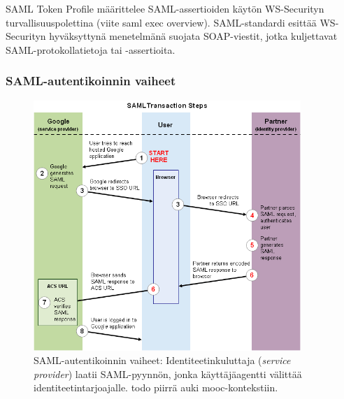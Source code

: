 \documentclass[finnish,gradu]{tktltiki}
\begin{document}
  SAML Token Profile määrittelee SAML-assertioiden käytön WS-Securityn turvallisuuspolettina (viite saml exec overview).
  SAML-standardi esittää WS-Securityn hyväksyttynä menetelmänä suojata SOAP-viestit, jotka kuljettavat SAML-protokollatietoja tai -assertioita.



  \subsubsection{SAML-autentikoinnin vaiheet} %
  \label{ssub:saml_autentikoinnin_vaiheet}

    \begin{figure}
      \centering
      \includegraphics[width=0.9\textwidth]{images/google_saml_workflow_vertical.png}
      \caption{SAML-autentikoinnin vaiheet: Identiteetinkuluttaja (\emph{service provider}) laatii SAML-pyynnön, jonka käyttäjäagentti välittää identiteetintarjoajalle. todo piirrä auki mooc-kontekstiin.}
      \label{fig:saml_auth_vaiheet}
    \end{figure}

\end{document}

